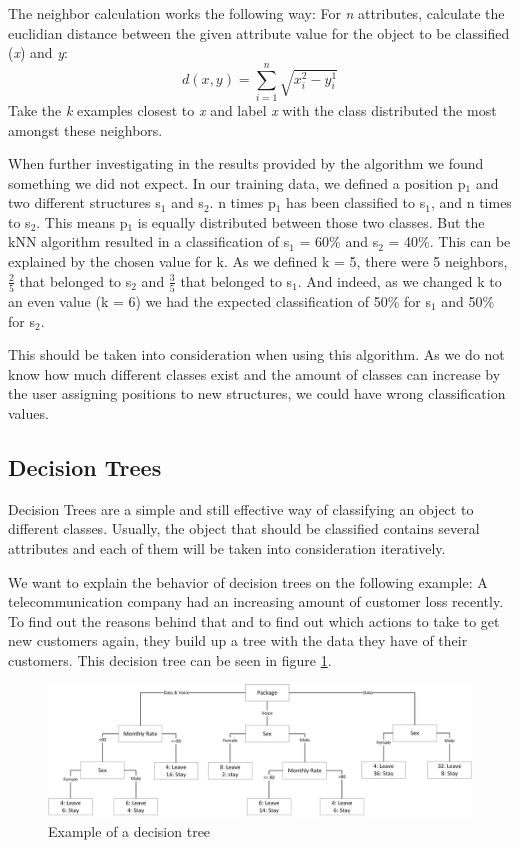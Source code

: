 The neighbor calculation works the following way: For \emph{n} attributes, calculate the euclidian distance between the given attribute value for the object to be classified (\emph{x}) and \emph{y}:
\[
d(x, y) = \sum\limits_{i=1}^n \sqrt{x_i^2 - y_i^1}
\]
Take the \emph{k} examples closest to \emph{x} and label \emph{x} with the class distributed the most amongst these neighbors.

When further investigating in the results provided by the algorithm we found something we did not expect. In our training data, we defined a position p$_1$ and two different structures s$_1$ and s$_2$. n times p$_1$ has been classified to s$_1$, and n times to s$_2$. This means p$_1$ is equally distributed between those two classes. But the kNN algorithm resulted in a classification of s$_1$ = 60\% and s$_2$ = 40\%. This can be explained by the chosen value for k. As we defined k = 5, there were 5 neighbors, $\frac{2}{5}$ that belonged to s$_2$ and $\frac{3}{5}$ that belonged to s$_1$. And indeed, as we changed k to an even value (k = 6) we had the expected classification of 50\% for s$_1$ and 50\% for s$_2$.

This should be taken into consideration when using this algorithm. As we do not know how much different classes exist and the amount of classes can increase by the user assigning positions to new structures, we could have wrong classification values.

\subsection{Decision Trees}
\label{sec4.2.2}
Decision Trees are a simple and still effective way of classifying an object to different classes. Usually, the object that should be classified contains several attributes and each of them will be taken into consideration iteratively.

We want to explain the behavior of decision trees on the following example: 
A telecommunication company had an increasing amount of customer loss recently. To find out the reasons behind that and to find out which actions to take to get new customers again, they build up a tree with the data they have of their customers. This decision tree can be seen in figure \ref{decisionTreeExample}.

\begin{figure}[ht!]
\centering
\includegraphics[width=\textwidth]{Images/ML/DecisionTreeExample.jpg}
\caption{Example of a decision tree \label{decisionTreeExample}}
\end{figure}

